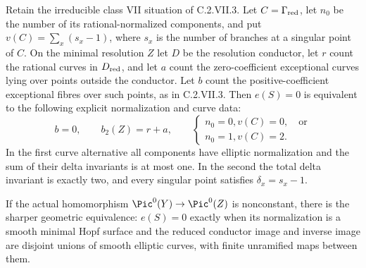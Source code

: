\begin{theorem}
\label{st:C.2.VII.4}
Retain the irreducible class VII situation of
C.2.VII.3. Let $C=\Gamma_{\rm red}$, let $n_0$
be the number of its rational-normalized components,
and put $v(C)=\sum_x(s_x-1)$, where $s_x$ is the
number of branches at a singular point of $C$.
On the minimal resolution $Z$ let $D$ be the
resolution conductor, let $r$ count the rational
curves in $D_{\rm red}$, and let $a$ count the
zero-coefficient exceptional curves lying over
points outside the conductor. Let $b$ count the
positive-coefficient exceptional fibres over
such points, as in C.2.VII.3. Then $e(S)=0$
is equivalent to the following explicit
normalization and curve data:
\[
 b=0,\qquad b_2(Z)=r+a,
 \qquad
 \begin{cases}
 n_0=0, v(C)=0,\quad\text{or}\\
 n_0=1, v(C)=2.
 \end{cases}
 \tag{C.VII.9}
\]
In the first curve alternative all components
have elliptic normalization and the sum of
their delta invariants is at most one. In the
second the total delta invariant is exactly
two, and every singular point satisfies
$\delta_x=s_x-1$.

If the actual homomorphism
$\Pic^0(Y)\to\Pic^0(Z)$ is nonconstant,
there is the sharper geometric equivalence:
$e(S)=0$ exactly when its normalization is a
smooth minimal Hopf surface and the reduced
conductor image and inverse image are disjoint
unions of smooth elliptic curves, with finite
unramified maps between them.
\end{theorem}
